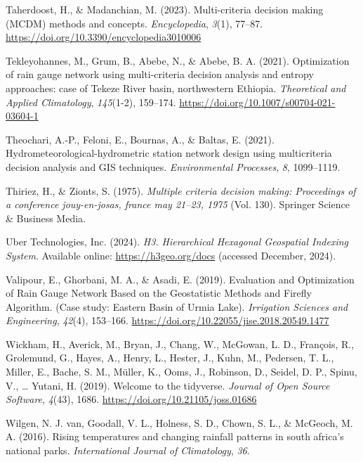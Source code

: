 \documentclass[spanish]{article}
\newlength{\cslhangindent}
\newlength{\cslentryspacingunit} %
\newenvironment{CSLReferences}[2] %
 {%
  \setlength{\parindent}{0pt}
  \ifodd #1
  \let\oldpar\par
  \def\par{\hangindent=\cslhangindent\oldpar}
  \fi
  \setlength{\parskip}{#2\cslentryspacingunit}
 }%
 {}
\begin{document}
\begin{CSLReferences}{1}{0}
\leavevmode{}%
Taherdoost, H., \& Madanchian, M. (2023). Multi-criteria decision making
(MCDM) methods and concepts. \emph{Encyclopedia}, \emph{3}(1), 77--87.
\url{https://doi.org/10.3390/encyclopedia3010006}

\leavevmode{}%
Tekleyohannes, M., Grum, B., Abebe, N., \& Abebe, B. A. (2021).
Optimization of rain gauge network using multi-criteria decision
analysis and entropy approaches: case of Tekeze River basin,
northwestern Ethiopia. \emph{Theoretical and Applied Climatology},
\emph{145}(1-2), 159--174.
\url{https://doi.org/10.1007/s00704-021-03604-1}

\leavevmode{}%
Theochari, A.-P., Feloni, E., Bournas, A., \& Baltas, E. (2021).
Hydrometeorological-hydrometric station network design using
multicriteria decision analysis and GIS techniques. \emph{Environmental
Processes}, \emph{8}, 1099--1119.

\leavevmode{}%
Thiriez, H., \& Zionts, S. (1975). \emph{Multiple criteria decision
making: Proceedings of a conference jouy-en-josas, france may 21--23,
1975} (Vol. 130). Springer Science \& Business Media.

\leavevmode{}%
Uber Technologies, Inc. (2024). \emph{{H3. Hierarchical Hexagonal
Geospatial Indexing System}}. Available online:
\url{https://h3geo.org/docs} (accessed December, 2024).

\leavevmode{}%
Valipour, E., Ghorbani, M. A., \& Asadi, E. (2019). Evaluation and
Optimization of Rain Gauge Network Based on the Geostatistic Methods and
Firefly Algorithm. (Case study: Eastern Basin of Urmia Lake).
\emph{Irrigation Sciences and Engineering}, \emph{42}(4), 153--166.
\url{https://doi.org/10.22055/jise.2018.20549.1477}

\leavevmode{}%
Wickham, H., Averick, M., Bryan, J., Chang, W., McGowan, L. D.,
François, R., Grolemund, G., Hayes, A., Henry, L., Hester, J., Kuhn, M.,
Pedersen, T. L., Miller, E., Bache, S. M., Müller, K., Ooms, J.,
Robinson, D., Seidel, D. P., Spinu, V., \ldots{} Yutani, H. (2019).
Welcome to the {tidyverse}. \emph{Journal of Open Source Software},
\emph{4}(43), 1686. \url{https://doi.org/10.21105/joss.01686}

\leavevmode{}%
Wilgen, N. J. van, Goodall, V. L., Holness, S. D., Chown, S. L., \&
McGeoch, M. A. (2016). Rising temperatures and changing rainfall
patterns in south africa's national parks. \emph{International Journal
of Climatology}, \emph{36}.


\end{CSLReferences}
\end{document}
